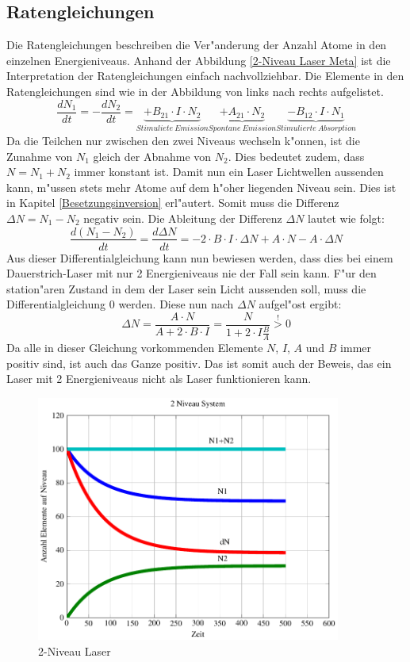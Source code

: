 \begin{refsection}
\subsection{Ratengleichungen}
\label{2-Niveau Ratengleichungen}
Die Ratengleichungen beschreiben die Ver"anderung der Anzahl Atome in den
einzelnen Energieniveaus.
Anhand der Abbildung \ref{2-Niveau Laser Meta} ist die Interpretation der
Ratengleichungen einfach nachvollziehbar.
Die Elemente in den Ratengleichungen sind wie in der Abbildung von links
nach rechts aufgelistet.
\[ \frac{dN_1}{dt} = -\frac{dN_2}{dt} = 
\underbrace{+ B_{21} \cdot  I \cdot N_2}_{Stimuliete~Emission}
\underbrace{+ A_{21}\cdot N_2}_{Spontane~Emission}
\underbrace{-B_{12} \cdot I \cdot N_1}_{Stimulierte~Absorption}\]
Da die Teilchen nur zwischen den zwei Niveaus wechseln k"onnen, ist die Zunahme
von $N_1$ gleich der Abnahme von $N_2$. 
Dies bedeutet zudem, dass $N = N_1 + N_2 $ immer konstant ist.
Damit nun ein Laser Lichtwellen aussenden kann, m"ussen stets mehr Atome auf
dem h"oher liegenden Niveau sein.
Dies ist in Kapitel \ref{Besetzungsinversion} erl"autert.
Somit muss die Differenz $\Delta N = N_1 - N_2$ negativ sein.
Die Ableitung der Differenz $\Delta N$ lautet wie folgt:
\[ \frac{d(N_1 - N_2)}{dt} = \frac{d \Delta N}{dt} = -2\cdot B\cdot I\cdot
\Delta N + A\cdot N - A\cdot \Delta N \]
Aus dieser Differentialgleichung kann nun bewiesen werden, dass dies bei einem
Dauerstrich-Laser mit nur 2 Energieniveaus nie der Fall sein kann. 
F"ur den station"aren Zustand in dem der Laser sein Licht aussenden soll, muss
die Differentialgleichung 0 werden.
Diese nun nach $\Delta N$ aufgel"ost ergibt:
\[ \Delta N = \frac{A\cdot N}{A+2\cdot B\cdot I} = \frac{N}{1+2\cdot I 
\frac{B}{A}} \stackrel{!}{>} 0\]
Da alle in dieser Gleichung vorkommenden Elemente $N$, $I$, $A$ und $B$ immer positiv
sind, ist auch das Ganze positiv.
Das ist somit auch der Beweis, das ein Laser mit 2 Energieniveaus nicht als
Laser funktionieren kann.
\begin{figure}
\centering
\includegraphics[width = 10cm]{laser/bilder/2_niveau.pdf}
\caption{2-Niveau Laser}
\label{2-Niveau Laser}
\end{figure}


\end{refsection}
